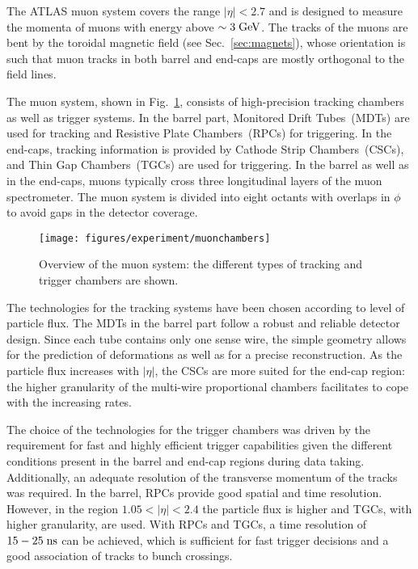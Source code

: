 The ATLAS muon system covers the range \mbox{$|\eta| < 2.7$} and is
designed to measure the momenta of muons with energy above \mbox{$\sim
  3 \; \mathrm{GeV}$}. 
The tracks of the muons are bent by the toroidal magnetic field (see
Sec.~\ref{sec:magnets}), whose orientation is such that muon tracks in
both barrel and end-caps are mostly orthogonal to the field lines.

The muon system, shown in Fig.~\ref{fig:muons}, consists of
high-precision tracking chambers as well as trigger systems.
In the barrel part, Monitored Drift Tubes~(MDTs) are used for tracking
and Resistive Plate Chambers~(RPCs) for triggering.
In the end-caps, tracking information is provided by Cathode Strip
Chambers~(CSCs), and Thin Gap Chambers~(TGCs) are used for
triggering.
In the barrel as well as in the end-caps, muons typically cross three
longitudinal layers of the muon spectrometer.
The muon system is divided into eight octants with overlaps in $\phi$
to avoid gaps in the detector coverage.

\begin{figure}[ht]
\begin{center}
\texttt{[image: figures/experiment/muonchambers]}
\caption[Overview of the muon system]{
  Overview of the muon system:
  the different types of tracking and trigger chambers are shown.}
\label{fig:muons}
\end{center}
\end{figure}

The technologies for the tracking systems have been chosen according to
level of particle flux.
The MDTs in the barrel part follow a robust and reliable detector design.
Since each tube contains only one sense wire, the simple geometry
allows for the prediction of deformations as well as for a precise
reconstruction.
As the particle flux increases with $|\eta|$, the CSCs are more suited
for the end-cap region: the higher granularity of the multi-wire
proportional chambers facilitates to cope with the increasing rates. 

The choice of the technologies for the trigger chambers was driven 
by the requirement for fast and highly efficient trigger capabilities
given the different conditions present in the barrel and end-cap
regions during data taking. 
Additionally, an adequate resolution of the transverse momentum of the
tracks was required. 
In the barrel, RPCs provide good spatial and time resolution.
However, in the region \mbox{$1.05 < |\eta| < 2.4$}  the particle flux
is higher and TGCs, with higher granularity, are used.
With RPCs and TGCs, a time resolution of \mbox{$15 - 25 \; \mathrm{ns}$} can be
achieved, 
which is sufficient for fast trigger decisions and a good association of
tracks to bunch crossings.

